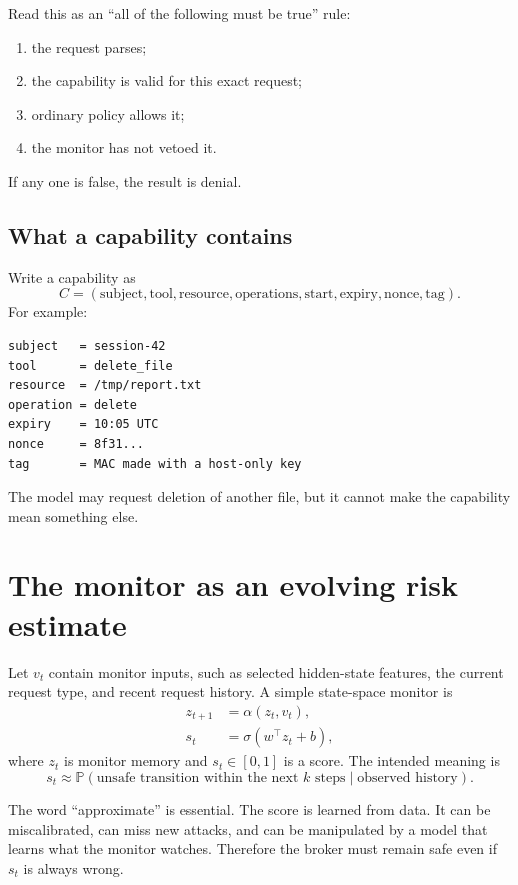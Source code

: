 \documentclass[11pt]{article}
\newcommand{\Prob}{\mathbb{P}}
\begin{document}
Read this as an ``all of the following must be true'' rule:
\begin{enumerate}
  \item the request parses;
  \item the capability is valid for this exact request;
  \item ordinary policy allows it;
  \item the monitor has not vetoed it.
\end{enumerate}
If any one is false, the result is denial.

\subsection{What a capability contains}
Write a capability as
\begin{equation}
 C=(\text{subject},\text{tool},\text{resource},\text{operations},\text{start},\text{expiry},\text{nonce},\text{tag}).
\end{equation}
For example:
\begin{Verbatim}
subject   = session-42
tool      = delete_file
resource  = /tmp/report.txt
operation = delete
expiry    = 10:05 UTC
nonce     = 8f31...
tag       = MAC made with a host-only key
\end{Verbatim}

The model may request deletion of another file, but it cannot make the capability mean something else.

\section{The monitor as an evolving risk estimate}

Let $v_t$ contain monitor inputs, such as selected hidden-state features, the current request type, and recent request history. A simple state-space monitor is
\begin{align}
 z_{t+1}&=\alpha(z_t,v_t),\\
 s_t&=\sigma(w^\top z_t+b),
\end{align}
where $z_t$ is monitor memory and $s_t\in[0,1]$ is a score. The intended meaning is
\begin{equation}
 s_t\approx\Prob(\text{unsafe transition within the next }k\text{ steps}\mid\text{observed history}).
\end{equation}

The word ``approximate'' is essential. The score is learned from data. It can be miscalibrated, can miss new attacks, and can be manipulated by a model that learns what the monitor watches. Therefore the broker must remain safe even if $s_t$ is always wrong.
\end{document}
